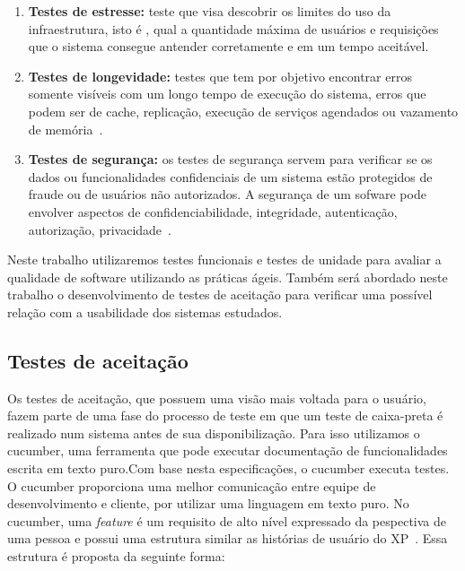 \begin{enumerate}
\item \textbf{Testes de estresse:} teste que visa descobrir os limites do uso da 
infraestrutura, isto é , qual a quantidade máxima de usuários e requisições que o 
sistema consegue antender corretamente e em um tempo aceitável.

\item \textbf{Testes de longevidade:} testes que tem por objetivo encontrar erros 
somente visíveis com um longo tempo de execução do sistema, erros que podem ser de cache, replicação, execução de serviços agendados ou vazamento de memória~\cite{bernardo2011}.

\item \textbf{Testes de segurança:} os testes de segurança servem para verificar se 
os dados ou funcionalidades confidenciais de um sistema  estão protegidos de fraude 
ou de usuários não autorizados. A segurança de um sofware pode envolver aspectos de 
confidenciabilidade, integridade, autenticação, autorização, privacidade~\cite{whittaker2006}.

\end{enumerate}

Neste trabalho utilizaremos testes funcionais e testes de unidade para avaliar a qualidade de software utilizando as práticas ágeis. Também será abordado neste trabalho o desenvolvimento de testes de aceitação para verificar uma possível relação com a usabilidade dos sistemas estudados. 

\subsection{Testes de aceitação}

Os testes de aceitação, que possuem uma visão mais voltada para o usuário, fazem 
parte de uma fase do processo de teste em que um teste de caixa-preta é realizado 
num sistema antes de sua disponibilização.
Para isso utilizamos o cucumber, uma ferramenta que pode executar documentação de funcionalidades escrita em texto puro.Com base nesta especificações, o cucumber executa testes. O cucumber proporciona uma melhor comunicação entre equipe de desenvolvimento e cliente, por utilizar uma linguagem  em texto puro.
%
No cucumber, uma \textit{feature} é um requisito de alto nível 
expressado da pespectiva de uma pessoa e possui uma estrutura similar as histórias 
de usuário do XP~. Essa estrutura é proposta da seguinte forma:


